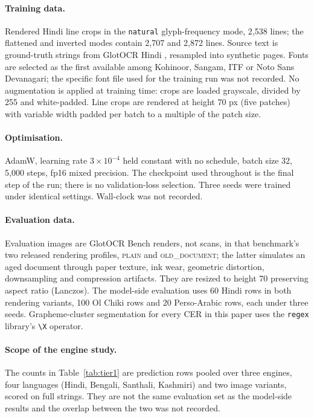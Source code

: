 \documentclass{article}
\begin{document}
\paragraph{Training data.} Rendered Hindi line crops in the \texttt{natural} glyph-frequency
mode, 2{,}538 lines; the flattened and inverted modes contain 2{,}707 and 2{,}872 lines. Source
text is ground-truth strings from GlotOCR Hindi \citep{kargaran2026glotocr}, resampled into
synthetic pages. Fonts are selected as the first available among Kohinoor, Sangam, ITF or Noto
Sans Devanagari; the specific font file used for the training run was not recorded. No
augmentation is applied at training time: crops are loaded grayscale, divided by 255 and
white-padded. Line crops are rendered at height 70 px (five patches) with variable width padded
per batch to a multiple of the patch size.

\paragraph{Optimisation.} AdamW, learning rate $3\times10^{-4}$ held constant with no schedule,
batch size 32, 5{,}000 steps, fp16 mixed precision. The checkpoint used throughout is the final
step of the run; there is no validation-loss selection. Three seeds were trained under
identical settings. Wall-clock was not recorded.

\paragraph{Evaluation data.} Evaluation images are GlotOCR Bench renders, not scans, in that
benchmark's two released rendering profiles, \textsc{plain} and \textsc{old\_document}; the
latter simulates an aged document through paper texture, ink wear, geometric distortion,
downsampling and compression artifacts.
They are resized to height 70 preserving aspect
ratio (Lanczos). The
model-side evaluation uses 60 Hindi rows in both rendering variants, 100 Ol Chiki rows
and 20 Perso-Arabic rows, each under three seeds. Grapheme-cluster segmentation for every CER
in this paper uses the \texttt{regex} library's \texttt{{\textbackslash}X} operator.

\paragraph{Scope of the engine study.} The counts in Table~\ref{tab:tier1} are prediction rows
pooled over three engines, four languages (Hindi, Bengali, Santhali, Kashmiri) and two image
variants, scored on full strings. They are not the same evaluation set as the model-side
results and the overlap between the two was not recorded.
\end{document}
